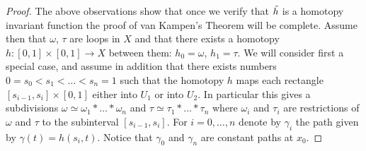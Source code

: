 \documentclass[11pt, letterpaper, oneside]{report}
\theoremstyle{pplain}
\theoremstyle{ddefinition}
\theoremstyle{nnn}
\theoremstyle{eexercise}
\newcommand{\ntilde}{\skew{3}\tilde}
\begin{document}
\begin{proof}
The above observations show that once we verify that $\ntilde{h}$ is a homotopy 
invariant function the proof of van Kampen's Theorem will be complete. 
Assume then that  $\omega$, $\tau$ are loops in $X$ 
and that there exists a homotopy 
$h\colon [0, 1]\times [0, 1] \to X$ between them: $h_{0} = \omega$, $h_{1}= \tau$. 
We will consider first a special case, and assume 
 in addition that there exists numbers $0= s_{0} < s_{1} < {\dots} < s_{n} = 1$ such that 
the homotopy  $h$ maps each rectangle $[s_{i-1}, s_{i}]\times [0, 1]$ either into $U_{1}$ or
into $U_{2}$.  In particular this gives a subdivisions $\omega\simeq \omega_{1} \ast {\dots} \ast \omega_{n}$
and $\tau \simeq \tau_{1} \ast {\dots} \ast \tau_{n}$ where $\omega_{i}$ and $\tau_{i}$
are restrictions of $\omega$ and $\tau$ to the subinterval $[s_{i-1}, s_{i}]$. For $i=0, \dots, n$
denote by $\gamma_{i}$ the path given by $\gamma(t) = h(s_{i}, t)$. Notice that $\gamma_{0}$ and 
$\gamma_{n}$ are constant paths at $x_{0}$. 

\end{proof}
\end{document}
